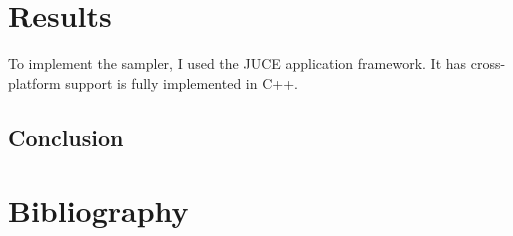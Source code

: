 \documentclass[12pt, a4paper, hidelinks]{article}
\begin{document}
	\newpage
	\section{Results}
	To implement the sampler, I used the JUCE application framework. It has cross-platform support is fully implemented in C++. 
	

	
	
	\subsection{Conclusion}
	 
	\newpage
	\section{Bibliography}
	
\end{document}
